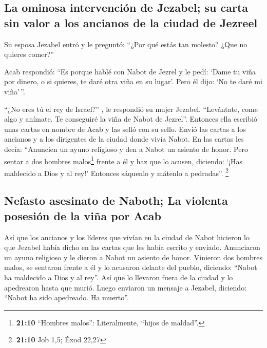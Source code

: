 \hypertarget{la-ominosa-intervenciuxf3n-de-jezabel-su-carta-sin-valor-a-los-ancianos-de-la-ciudad-de-jezreel}{%
\subsection{La ominosa intervención de Jezabel; su carta sin valor a los
ancianos de la ciudad de
Jezreel}\label{la-ominosa-intervenciuxf3n-de-jezabel-su-carta-sin-valor-a-los-ancianos-de-la-ciudad-de-jezreel}}

 Su esposa Jezabel entró y le preguntó: ``¿Por qué estás
tan molesto? ¿Que no quieres comer?''

 Acab respondió: ``Es porque hablé con Nabot de Jezrel y
le pedí: `Dame tu viña por dinero, o si quieres, te daré otra viña en su
lugar'. Pero él dijo: `No te daré mi viña'\,''.

 ``¿No eres tú el rey de Israel?'' , le respondió su mujer
Jezabel. ``Levántate, come algo y anímate. Te conseguiré la viña de
Nabot de Jezrel''.  Entonces ella escribió unas cartas en
nombre de Acab y las selló con su sello. Envió las cartas a los ancianos
y a los dirigentes de la ciudad donde vivía Nabot.  En las
cartas les decía: ``Anuncien un ayuno religioso y den a Nabot un asiento
de honor.  Pero sentar a dos hombres malos\footnote{\textbf{21:10}
  ``Hombres malos'': Literalmente, ``hijos de maldad''.} frente a él y
haz que lo acusen, diciendo: `¡Has maldecido a Dios y al rey!' Entonces
sáquenlo y mátenlo a pedradas''. \footnote{\textbf{21:10} Job 1,5; Éxod
  22,27}

\hypertarget{nefasto-asesinato-de-naboth-la-violenta-posesiuxf3n-de-la-viuxf1a-por-acab}{%
\subsection{Nefasto asesinato de Naboth; La violenta posesión de la viña
por
Acab}\label{nefasto-asesinato-de-naboth-la-violenta-posesiuxf3n-de-la-viuxf1a-por-acab}}

 Así que los ancianos y los líderes que vivían en la
ciudad de Nabot hicieron lo que Jezabel había dicho en las cartas que
les había escrito y enviado.  Anunciaron un ayuno
religioso y le dieron a Nabot un asiento de honor. 
Vinieron dos hombres malos, se sentaron frente a él y lo acusaron
delante del pueblo, diciendo: ``Nabot ha maldecido a Dios y al rey''.
Así que lo llevaron fuera de la ciudad y lo apedrearon hasta que murió.
 Luego enviaron un mensaje a Jezabel, diciendo: ``Nabot
ha sido apedreado. Ha muerto''.


